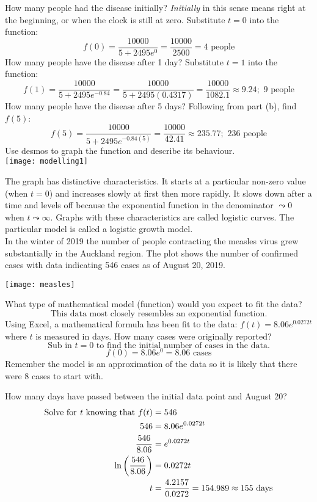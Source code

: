 \begin{tasks}
	\task How many people had the disease initially?
	\textit{Initially} in this sense means right at the beginning, or when the clock is still at zero. Substitute $t=0$ into the function:
	\[f(0)=\frac{10000}{5+2495e^0}=\frac{10000}{2500}=4\text{ people}\]
	\task How many people have the disease after 1 day?
	Substitute $t=1$ into the function:
	\[f(1)=\frac{10000}{5+2495e^{-0.84}}=\frac{10000}{5+2495(0.4317)}=\frac{10000}{1082.1}\approx 9.24;\text{ 9 people}\]
	\task How many people have the disease after 5 days? 
	Following from part (b), find $f(5)$:\\
	\[f(5)=\frac{10000}{5+2495e^{-0.84(5)}}=\frac{10000}{42.41}\approx 235.77;\text{ 236 people}\]	
	\task Use desmos to graph the function and describe its behaviour. \\
	\texttt{[image: modelling1]}
\end{tasks}

The graph has distinctive characteristics. It starts at a particular non-zero value (when $t =0$) and increases slowly at first then more rapidly. It slows down after a time and levels off because the exponential function in the denominator $ \leadsto 0$ when $t \leadsto \infty $. Graphs with these characteristics are called logistic curves. The particular model is called a logistic growth model. 
\clearpage
\examq\medskip \\In the winter of 2019 the number of people contracting the measles virus grew substantially in the Auckland region. The plot shows the number of confirmed cases with data indicating 546 cases as of August 20, 2019.
\begin{center}
	\texttt{[image: measles]}
\end{center}
\begin{tasks}
	\task What type of mathematical model (function) would you expect to fit the data?\\
	\[\text{This data most closely resembles an exponential function.}\]
	\task Using Excel, a mathematical formula has been fit to the data:	$\displaystyle f(t)=8.06e^{0.0272t}$ where $t$ is measured in days. How many cases were originally reported?\\
	\[\text{Sub in $t=0$ to find the initial number of cases in the data.}\]
	\[f(0)=8.06e^0=8.06 \text{ cases}\]
	Remember the model is an approximation of the data so it is likely that there were 8 cases to start with.
	
	\task How many days have passed between the initial data point and August 20?\\
	\begin{align*}\text{Solve for \textit{t} knowing that }f(t)&=546\\
	546&=8.06e^{0.0272t}\\
	\frac{546}{8.06}&=e^{0.0272t}\\
	\ln\left(\frac{546}{8.06}\right)&=0.0272t\\
	t&=\frac{4.2157}{0.0272}=154.989\approx 155\text{ days}\\
	\end{align*}
\end{tasks}

